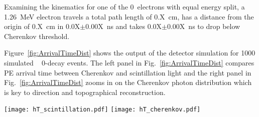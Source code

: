Examining the kinematics for one of the 0\nbb~electrons with equal energy split, a 1.26~MeV electron travels a total path length of 0.X~cm, 
has a distance from the origin of 0.X~cm in 0.0X$\pm$0.00X~ns  and takes 0.0X$\pm$0.00X~ns to drop below Cherenkov threshold. 

Figure~\ref{fig:ArrivalTimeDist} shows the output of the detector simulation for 1000 simulated \Te~ 0\nbb-decay 
events. The left panel in Fig.~\ref{fig:ArrivalTimeDist} compares PE arrival time between Cherenkov and scintillation light  
and the right panel in Fig.~\ref{fig:ArrivalTimeDist} zooms in on the Cherenkov photon distribution which is key to direction and 
topographical reconstruction.


\begin{figure*}[ht]
  \centering
  \texttt{[image: hT\_scintillation.pdf]}
  \texttt{[image: hT\_cherenkov.pdf]}
  \caption{\emph{Left:} Photo-electron (PE) arrival times after
    application of the photo-detector transit time spread (TTS) of 100~ps for the default simulation 
    of \Te~0\nbb-decay and \C~events produced at the center of the detector. 
    Scintillation PE arrival time distribution is compared for \nbb-decay (dashed blue line) and
    \Cten~events (dotted green line). The corresponding distribution for \B~events is not shown
    because it is indistinguishable from the distribution for \nbb-decay. Cherenkov PE arrival
    times are shown for \nbb-decay (\emph{solid red line}) to demonstrate their contribution to the early PE sample.
    The vertical line at 33.5~ns indicates the time cut for the selection of the early PE sample.
    The shape of scintillation PE arrival times for \B~events
    \emph{Right:} Comparison between Cherenkov PEs arrival time for \Te~0\nbb-decay (\emph{solid line}), 
    \B~(\emph{dashed line}), and \C~events (\emph{dotted line}).}
\label{fig:ArrivalTimeDist}
\end{figure*}



